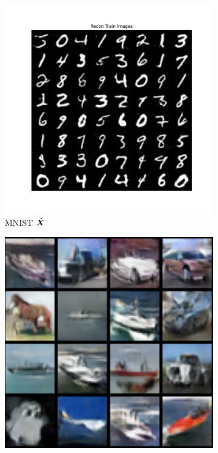 \documentclass[../../book-main.tex]{subfiles}
\begin{document}
\begin{figure}[t]
    \begin{subfigure}[t]{0.3\textwidth}
        \centering
        \includegraphics[width=\textwidth]{chapters/chapter5/figs/MNIST_MNIST_train_recon_images_epoch200_multi.png}
        \caption{{\small MNIST $\hat{\bm{X}}$}}
    \end{subfigure}
    \hfill
    \begin{subfigure}[t]{0.3\textwidth}
        \centering
        \includegraphics[width=\textwidth]{chapters/chapter5/figs/cifar_reconstruct.png}

\end{subfigure}
\end{figure}
\end{document}
